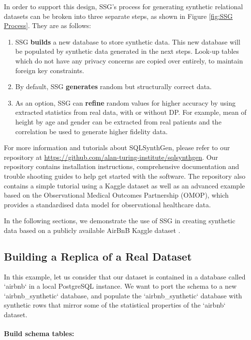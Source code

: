 \documentclass[11pt]{article}
\begin{document}
In order to support this design, SSG's process for generating synthetic relational datasets can be broken into three separate steps, as shown in Figure \ref{fig:SSG Process}. They are as follows:

\begin{enumerate}
    \item SSG \textbf{builds} a new database to store synthetic data. This new database will be populated by synthetic data generated in the next steps. Look-up tables which do not have any privacy concerns are copied over entirely, to maintain foreign key constraints.
    \item By default, SSG \textbf{generates} random but structurally correct data. 
    \item As an option, SSG can \textbf{refine} random values for higher accuracy by using extracted statistics from real data, with or without DP. For example, mean of height by age and gender can be extracted from real patients and the correlation be used to generate higher fidelity data.
\end{enumerate}

For more information and tutorials about SQLSynthGen, please refer to our repository at \url{https://github.com/alan-turing-institute/sqlsynthgen}. Our repository \cite{repository} contains installation instructions, comprehensive documentation and trouble shooting guides to help get started with the software. The repository also contains a simple tutorial using a Kaggle dataset \cite{airbnb} as well as an advanced example based on the Observational Medical Outcomes Partnership (OMOP)\cite{omop}, which provides a standardised data model for observational healthcare data. 

In the following sections, we demonstrate the use of SSG in creating synthetic data based on a publicly available AirBnB Kaggle dataset \cite{airbnb}.

\subsection{Building a Replica of a Real Dataset}

In this example, let us consider that our dataset is contained in a database called `airbnb` in a local PostgreSQL instance. We want to port the schema to a new `airbnb\_synthetic` database, and populate the `airbnb\_synthetic` database with synthetic rows that mirror some of the statistical properties of the `airbnb` dataset.

\paragraph{Build schema tables:}
\end{document}
